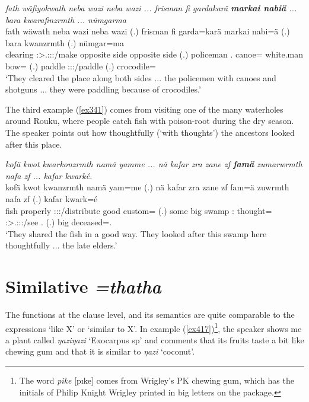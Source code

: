 \begin{exe}
	\ex \emph{fath wäfiyokwath neba wazi neba wazi ... frisman fi gardakarä \textbf{markai nabiä} ... bara kwarafinzrmth ... nümgarma}\\
	\gll fath wäwath neba wazi neba wazi (.) frisman fi garda=karä markai nabi=ä (.) bara kwanzrmth (.) nümgar=ma\\
	clearing \Stpl:\Sbj>\Tsg.\F:\Obj:\Nonpast:\Ipfv/make opposite side opposite side (.) policeman \Third.{\Abs} canoe={\Prop} {white.man} bow={\Assoc} (.) paddle \Stpl:\Sbj:\Pst:\Dur/paddle (.) crocodile={\Char}\\
	\trans `They cleared the place along both sides ... the policemen with canoes and shotguns ... they were paddling because of crocodiles.'
	\label{ex337}
\end{exe}

The third example (\ref{ex341}) comes from visiting one of the many waterholes around Rouku, where people catch fish with poison-root during the dry season. The speaker points out how thoughtfully (`with thoughts') the ancestors looked after this place.

\begin{exe}
	\ex \emph{kofä kwot kwarkonzrmth namä yamme ... nä kafar zra zane zf \textbf{famä} zumarwrmth nafa zf ... kafar kwarké.}\\
	\gll kofä kwot kwanzrmth namä yam=me (.) nä kafar zra zane zf fam=ä zuwrmth nafa zf (.) kafar kwark=é\\
	fish properly \Stpl:\Sbj:\Pst:\Dur/distribute good custom={\Ins} (.) some big swamp \Dem:{\Prox} {\Imm} thought={\Assoc} \Stpl:\Sbj>\Tsg.\F:\Obj:\Pst:\Dur/see \Tnsg.{\Erg} {\Imm} (.) big deceased=\Erg.{\Nsg}\\
	\trans `They shared the fish in a good way. They looked after this swamp here thoughtfully ... the late elders.'\\
	\label{ex341}
\end{exe}

\section{Similative \emph{=thatha}} \label{similcase}

The   functions at the clause level, and its semantics are quite comparable to the  expressions `like X' or `similar to X'. In example (\ref{ex417})\footnote{The word \emph{pike} [pıke] comes from Wrigley's PK\textsuperscript{\textregistered} chewing gum, which has the initials of Philip Knight Wrigley printed in big letters on the package.}, the speaker shows me a plant called \emph{ŋaziŋazi} `Exocarpus sp' and comments that its fruits taste a bit like chewing gum and that it is similar to \emph{ŋazi} `coconut'.

